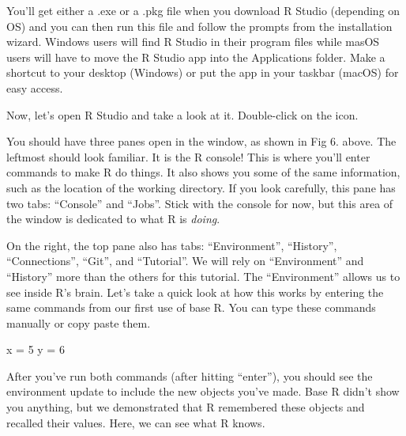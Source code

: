 \documentclass[
]{article}
\newenvironment{Shaded}{\begin{snugshade}}{\end{snugshade}}
\newcommand{\DecValTok}[1]{\textcolor[rgb]{0.00,0.00,0.81}{#1}}
\newcommand{\NormalTok}[1]{#1}
\newcommand{\OtherTok}[1]{\textcolor[rgb]{0.56,0.35,0.01}{#1}}
\begin{document}
\hfill\break
\hfill\break

You'll get either a .exe or a .pkg file when you download R Studio
(depending on OS) and you can then run this file and follow the prompts
from the installation wizard. Windows users will find R Studio in their
program files while masOS users will have to move the R Studio app into
the Applications folder. Make a shortcut to your desktop (Windows) or
put the app in your taskbar (macOS) for easy access.

Now, let's open R Studio and take a look at it. Double-click on the
icon.

\hfill\break
\hfill\break

You should have three panes open in the window, as shown in Fig 6.
above. The leftmost should look familiar. It is the R console! This is
where you'll enter commands to make R do things. It also shows you some
of the same information, such as the location of the working directory.
If you look carefully, this pane has two tabs: ``Console'' and ``Jobs''.
Stick with the console for now, but this area of the window is dedicated
to what R is \emph{doing}.

On the right, the top pane also has tabs: ``Environment'', ``History'',
``Connections'', ``Git'', and ``Tutorial''. We will rely on
``Environment'' and ``History'' more than the others for this tutorial.
The ``Environment'' allows us to see inside R's brain. Let's take a
quick look at how this works by entering the same commands from our
first use of base R. You can type these commands manually or copy paste
them.

\begin{Shaded}
\begin{Highlighting}[]
\NormalTok{x }\OtherTok{=} \DecValTok{5}
\NormalTok{y }\OtherTok{=} \DecValTok{6}
\end{Highlighting}
\end{Shaded}

\hfill\break

After you've run both commands (after hitting ``enter''), you should see
the environment update to include the new objects you've made. Base R
didn't show you anything, but we demonstrated that R remembered these
objects and recalled their values. Here, we can see what R knows.\\
\end{document}
